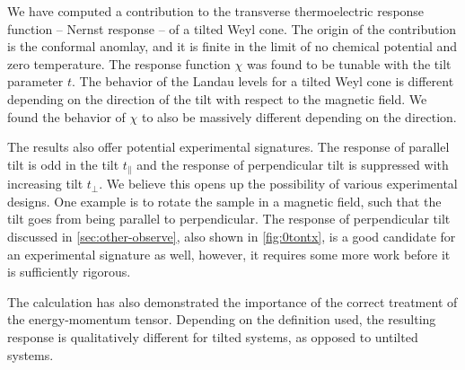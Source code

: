 We have computed a contribution to the transverse thermoelectric response function -- Nernst response -- of a tilted Weyl cone.
The origin of the contribution is the conformal anomlay, and it is finite in the limit of no chemical potential and zero temperature.
The response function \( \chi \) was found to be tunable with the tilt parameter \( t \).
The behavior of the Landau levels for a tilted Weyl cone is different depending on the direction of the tilt with respect to the magnetic field.
We found the behavior of \( \chi \) to also be massively different depending on the direction.

The results also offer potential experimental signatures.
The response of parallel tilt is odd in the tilt \( t_\parallel \) and the response of perpendicular tilt is suppressed with increasing tilt \( t_\perp \).
We believe this opens up the possibility of various experimental designs.
One example is to rotate the sample in a magnetic field, such that the tilt goes from being parallel to perpendicular.
The response of perpendicular tilt discussed in \cref{sec:other-observe}, also shown in \cref{fig:0tontx}, is a good candidate for an experimental signature as well, however, it requires some more work before it is sufficiently rigorous.


The calculation has also demonstrated the importance of the correct treatment of the energy-momentum tensor.
Depending on the definition used, the resulting response is qualitatively different for tilted systems, as opposed to untilted systems.

